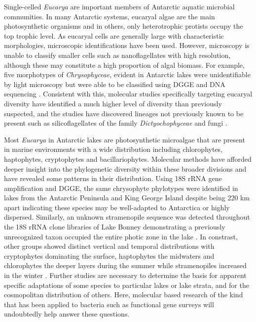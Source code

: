 Single-celled \emph{Eucarya} are important members of Antarctic aquatic microbial communities.
In many Antarctic systems, eucaryal algae are the main photosynthetic organisms and in others, only heterotrophic protists occupy the top trophic level. 
As eucaryal cells are generally large with characteristic morphologies, microscopic identifications have been used. 
However, microscopy is unable to classify smaller cells such as nanoflagellates with high resolution, although these may constitute a high proportion of algal biomass.
For example, five morphotypes of \emph{Chrysophyceae}, evident in Antarctic lakes were unidentifiable by light microscopy but were able to be classified using \ac{DGGE} and \textsc{DNA} sequencing \cite{Unrein2005}.
Consistent with this, molecular studies specifically targeting eucaryal diversity \cite{Unrein2005, Mosier2007, Bielewicz2011} have identified a much higher level of diversity than previously suspected,
 and the studies have discovered lineages not previously known to be present such as silicoflagellates of the family \emph{Dictyochophyceae} \cite{Unrein2005} and fungi \cite{Mosier2007, Bielewicz2011}.

Most \emph{Eucarya} in Antarctic lakes are photosynthetic microalgae that are present in marine environments with a wide distribution including chlorophytes, haptophytes, cryptophytes and bacillariophytes.
Molecular methods have afforded deeper insight into the phylogenetic diversity within these broader divisions and have revealed some patterns in their distribution. 
Using 18S \ac{rRNA} gene amplification and \ac{DGGE}, the same chrysophyte phylotypes were identified in lakes from the Antarctic Peninsula and King George Island 
despite being 220 km apart \cite{Unrein2005} indicating these species may be well-adapted to Antarctica or highly dispersed.
Similarly, an unknown stramenopile sequence was detected throughout the 18S \ac{rRNA} clone libraries of Lake Bonney 
demonstrating a previously unrecognized taxon occupied the entire photic zone in the lake \cite{Bielewicz2011}. 
In constrast, other groups showed distinct vertical and temporal distributions with cryptophytes dominating the surface, 
haptophytes the midwaters and chlorophytes the deeper layers during the summer while stramenopiles increased in the winter \cite{Bielewicz2011}. 
Further studies are necessary to determine the basis for apparent specific adaptations of some species to particular lakes or lake strata, and for the cosmopolitan distribution of others.
Here, molecular based research of the kind that has been applied to bacteria such as functional gene surveys will undoubtedly help answer these questions.
